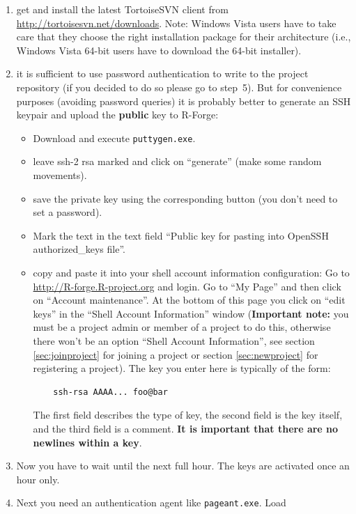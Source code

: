 \documentclass[a4paper]{article}
\newcommand{\proglang}[1]{\textsf{#1}}
\begin{document}
\begin{enumerate}
\item get and install the latest TortoiseSVN client from
  \url{http://tortoisesvn.net/downloads}. Note: Windows Vista users
  have to take care that they choose the right installation package
  for their architecture (i.e., Windows Vista 64-bit users have to
  download the 64-bit installer).
\item it is sufficient to use password authentication to write to the
  project repository (if you decided to do so please go to
  step~5). But for convenience purposes (avoiding password 
  queries) it is probably better to
  generate an SSH keypair and upload the \textbf{public} 
  key to \proglang{R}-Forge:
  \begin{itemize}
  \item Download and execute \texttt{puttygen.exe}.
  \item leave ssh-2 rsa marked and click on ``generate'' (make some
    random movements).
  \item save the private key using the corresponding button (you don't
    need to set a password).
  \item  Mark the text in the text field ``Public key
    for pasting into OpenSSH authorized\_keys file''.
  \item copy and paste it into your shell account information
    configuration: Go to \url{http://R-forge.R-project.org} and
    login. Go to ``My Page'' and then click on ``Account
    maintenance''. At the bottom 
    of this page you click on ``edit keys'' in the ``Shell Account
    Information'' window (\textbf{Important note:} you must be a project admin
    or member of a project to do this, otherwise there won't be an
    option ``Shell Account Information'', see section
    \ref{sec:joinproject} for joining a project or section
    \ref{sec:newproject} for registering a project).
    The key you enter here is typically of the form:
    \begin{verbatim}
    ssh-rsa AAAA... foo@bar
    \end{verbatim}
    The first field
    describes the type of key, the second field is the key itself, and
    the third field is a comment. \textbf{It is important that there are no
      newlines within a key}.
  \end{itemize}
\item Now you have to wait until the next full hour. The keys are
  activated once an hour only.
\item Next you need an authentication agent like \texttt{pageant.exe}. Load

\end{enumerate}
\end{document}
